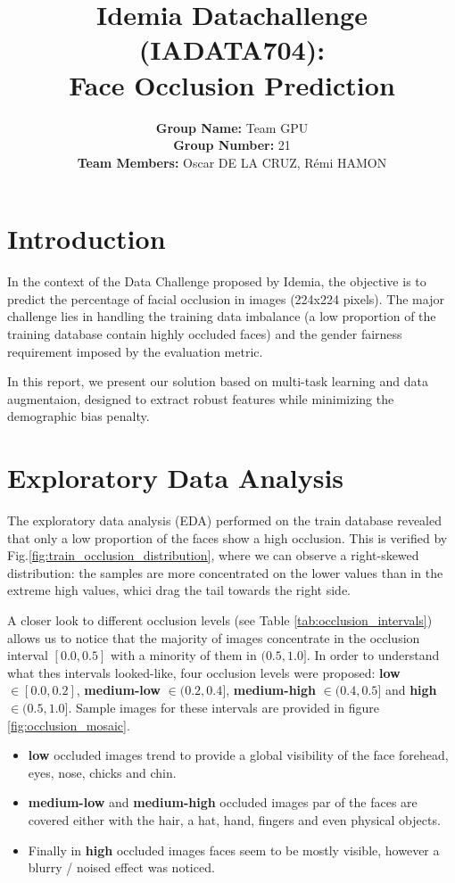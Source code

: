 \documentclass[10pt, twocolumn]{article}
\title{\vspace{-1.5cm}\textbf{Idemia Datachallenge (IADATA704): \\ Face Occlusion Prediction}}
\author{
    \textbf{Group Name:} Team GPU \\
    \textbf{Group Number:} 21 \\
    \textbf{Team Members:} Oscar DE LA CRUZ, Rémi HAMON
}
\date{    
        \parbox{\textwidth}{
            \centering
            \textbf{Project repository:}
            \url{https://github.com/odelacruz-fierro/data-challenge-idemia.git}
        }
    \vspace{-0.5cm}
}
\begin{document}
\maketitle

\section{Introduction}
In the context of the Data Challenge proposed by Idemia, the objective is to predict the percentage of facial occlusion
in images (224x224 pixels). The major challenge lies in handling the training data imbalance (a low proportion of the training database
contain highly occluded faces) and the gender fairness requirement imposed by the evaluation metric.

In this report, we present our solution based on multi-task learning and data augmentaion, designed to extract robust features
while minimizing the demographic bias penalty.

\section{Exploratory Data Analysis}
\label{sec:eda}

The exploratory data analysis (EDA) performed on the train database revealed that only a low proportion of the faces show a high occlusion.
This is verified by Fig.\ref{fig:train_occlusion_distribution}, where we can observe a right-skewed distribution: the samples are more concentrated
on the lower values than in the extreme high values, whici drag the tail towards the right side.

A closer look to different occlusion levels (see Table \ref{tab:occlusion_intervals}) allows us to notice that the majority of images concentrate
in the occlusion interval $[0.0,0.5]$ with a minority of them in $(0.5,1.0]$. In order to understand what thes intervals looked-like, four
occlusion levels were proposed: \textbf{low} $\in [0.0, 0.2]$, \textbf{medium-low} $\in (0.2, 0.4]$, \textbf{medium-high} $\in (0.4, 0.5]$ and
\textbf{high} $\in (0.5, 1.0]$. Sample images for these intervals are provided in figure \ref{fig:occlusion_mosaic}.
%

\begin{itemize}
    \item \textbf{low} occluded images trend to provide a global visibility of the face forehead, eyes, nose, chicks and chin.
    \item \textbf{medium-low} and \textbf{medium-high} occluded images par of the faces are covered either with the hair, a hat,
    hand, fingers and even physical objects.
    \item Finally in \textbf{high} occluded images faces seem to be mostly visible, however a blurry / noised effect was noticed. 
\end{itemize}
\end{document}
